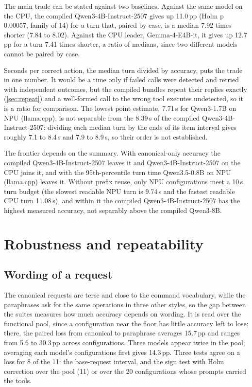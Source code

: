 \documentclass[11pt]{article}
\begin{document}
The main trade can be stated against two baselines. Against the same model on the CPU, the compiled Qwen3-4B-Instruct-2507 gives up 11.0\,pp (Holm p 0.00057, family of 14) for a turn that, paired by case, is a median 7.92 times shorter (7.84 to 8.02). Against the CPU leader, Gemma-4-E4B-it, it gives up 12.7\,pp for a turn 7.41 times shorter, a ratio of medians, since two different models cannot be paired by case.

Seconds per correct action, the median turn divided by accuracy, puts the trade in one number. It would be a time only if failed calls were detected and retried with independent outcomes, but the compiled bundles repeat their replies exactly (\cref{sec:repeat}) and a well-formed call to the wrong tool executes undetected, so it is a ratio for comparison. The lowest point estimate, 7.71\,s for Qwen3-1.7B on NPU (llama.cpp), is not separable from the 8.39\,s of the compiled Qwen3-4B-Instruct-2507: dividing each median turn by the ends of its item interval gives roughly 7.1 to 8.4\,s and 7.9 to 8.9\,s, so their order is not established.

The frontier depends on the summary. With canonical-only accuracy the compiled Qwen3-4B-Instruct-2507 leaves it and Qwen3-4B-Instruct-2507 on the CPU joins it, and with the 95th-percentile turn time Qwen3.5-0.8B on NPU (llama.cpp) leaves it. Without prefix reuse, only NPU configurations meet a 10\,s turn budget (the slowest readable NPU turn is 9.74\,s and the fastest readable CPU turn 11.08\,s), and within it the compiled Qwen3-4B-Instruct-2507 has the highest measured accuracy, not separably above the compiled Qwen3-8B.

\section{Robustness and repeatability}\label{sec:robust}

\subsection{Wording of a request}\label{sec:wording}

The canonical requests are terse and close to the command vocabulary, while the paraphrases ask for the same operations in three other styles, so the gap between the suites measures how much accuracy depends on wording. It is read over the functional pool, since a configuration near the floor has little accuracy left to lose; there, the paired loss from canonical to paraphrase averages 15.7\,pp and ranges from 5.6 to 30.3\,pp across configurations. Three models appear twice in the pool; averaging each model's configurations first gives 14.3\,pp. Three tests agree on a loss for 8 of the 11: the base-request interval, and the sign test with Holm correction over the pool (11) or over the 20 configurations whose prompts carried the tools.
\end{document}
